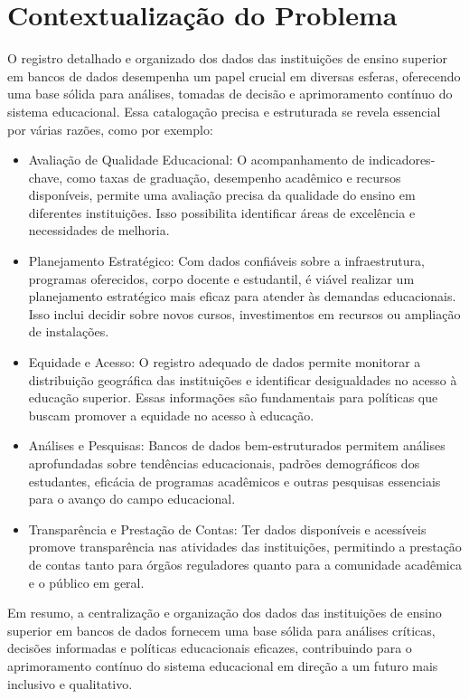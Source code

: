 \documentclass[12pt]{article}
\begin{document}
\section{Contextualização do Problema} \label{sec:firstpage}
O registro detalhado e organizado dos dados das instituições de ensino superior em bancos de dados desempenha um papel crucial em diversas esferas, oferecendo uma base sólida para análises, tomadas de decisão e aprimoramento contínuo do sistema educacional. Essa catalogação precisa e estruturada se revela essencial por várias razões, como por exemplo:

\begin{itemize}
    \item Avaliação de Qualidade Educacional: O acompanhamento de indicadores-chave, como taxas de graduação, desempenho acadêmico e recursos disponíveis, permite uma avaliação precisa da qualidade do ensino em diferentes instituições. Isso possibilita identificar áreas de excelência e necessidades de melhoria.

    \item Planejamento Estratégico: Com dados confiáveis sobre a infraestrutura, programas oferecidos, corpo docente e estudantil, é viável realizar um planejamento estratégico mais eficaz para atender às demandas educacionais. Isso inclui decidir sobre novos cursos, investimentos em recursos ou ampliação de instalações.

    \item Equidade e Acesso: O registro adequado de dados permite monitorar a distribuição geográfica das instituições e identificar desigualdades no acesso à educação superior. Essas informações são fundamentais para políticas que buscam promover a equidade no acesso à educação.

    \item Análises e Pesquisas: Bancos de dados bem-estruturados permitem análises aprofundadas sobre tendências educacionais, padrões demográficos dos estudantes, eficácia de programas acadêmicos e outras pesquisas essenciais para o avanço do campo educacional.

    \item Transparência e Prestação de Contas: Ter dados disponíveis e acessíveis promove transparência nas atividades das instituições, permitindo a prestação de contas tanto para órgãos reguladores quanto para a comunidade acadêmica e o público em geral.
\end{itemize}
Em resumo, a centralização e organização dos dados das instituições de ensino superior em bancos de dados fornecem uma base sólida para análises críticas, decisões informadas e políticas educacionais eficazes, contribuindo para o aprimoramento contínuo do sistema educacional em direção a um futuro mais inclusivo e qualitativo.
\end{document}
